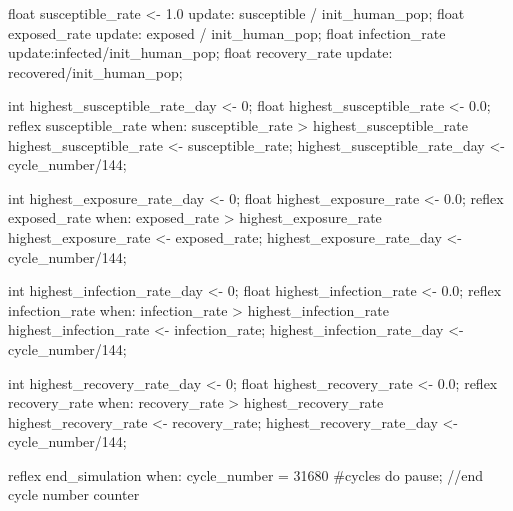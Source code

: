 \begin{verbatimtab}[4]
{        
        float susceptible_rate <- 1.0 update: susceptible / init_human_pop;
        float exposed_rate update: exposed / init_human_pop;
        float infection_rate update:infected/init_human_pop;
        float recovery_rate update: recovered/init_human_pop;
        
        int highest_susceptible_rate_day <- 0;
        float highest_susceptible_rate <- 0.0;
        reflex susceptible_rate when: susceptible_rate > highest_susceptible_rate{
            highest_susceptible_rate <- susceptible_rate;
            highest_susceptible_rate_day <- cycle_number/144;
        }	
        
        int highest_exposure_rate_day <- 0;
        float highest_exposure_rate <- 0.0;
        reflex exposed_rate when: exposed_rate > highest_exposure_rate{
            highest_exposure_rate <- exposed_rate;
            highest_exposure_rate_day <- cycle_number/144;
        }	
        
        
        int highest_infection_rate_day <- 0;
        float highest_infection_rate <- 0.0;
        reflex infection_rate when: infection_rate > highest_infection_rate{
            highest_infection_rate <- infection_rate;
            highest_infection_rate_day <- cycle_number/144;
        }
        
        int highest_recovery_rate_day <- 0;
        float highest_recovery_rate <- 0.0;
        reflex recovery_rate when: recovery_rate > highest_recovery_rate{
            highest_recovery_rate <- recovery_rate;
            highest_recovery_rate_day <- cycle_number/144;
        }
        
        reflex end_simulation when: cycle_number = 31680 #cycles{
            do pause;
        }//end cycle number counter
        
}
\end{verbatimtab}
